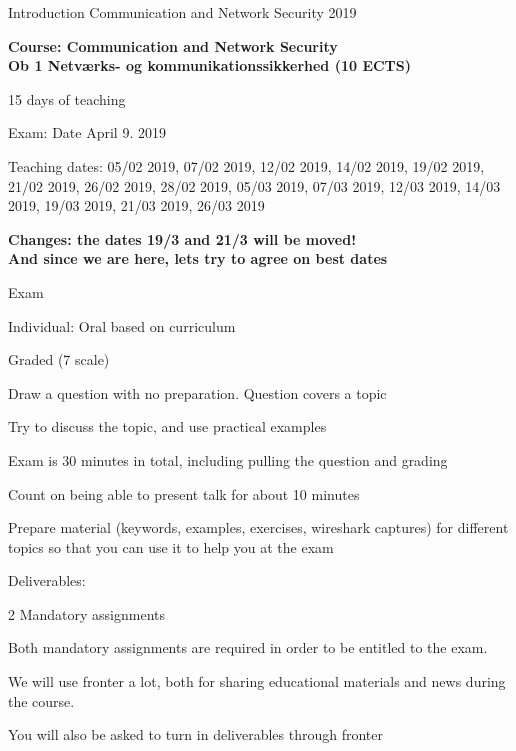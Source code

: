\documentclass[Screen16to9,17pt]{foils}
\begin{document}
\mytitlepage
{Introduction}
{Communication and Network Security 2019}

\hlkprofiluk


{\Large\bf Course: Communication and Network Security\\
Ob 1 Netværks- og kommunikationssikkerhed (10 ECTS)}

15 days of teaching

Exam:
Date April 9. 2019

Teaching dates: 05/02 2019, 07/02 2019, 12/02 2019, 14/02 2019, 19/02 2019, 21/02 2019, 26/02 2019, 28/02 2019, 05/03 2019, 07/03 2019, 12/03 2019, 14/03 2019, 19/03 2019, 21/03 2019, 26/03 2019

{\bf Changes: the dates 19/3 and 21/3 will be moved!\\
And since we are here, lets try to agree on best dates}



\begin{list2}
\item Exam
\item Individual: Oral based on curriculum
\item Graded (7 scale)
\item Draw a question with no preparation. Question covers a topic
\item Try to discuss the topic, and use practical examples
\item Exam is 30 minutes in total, including pulling the question and grading
\item Count on being able to present talk for about 10 minutes
\item Prepare material (keywords, examples, exercises, wireshark captures) for different topics so that you can use it to help you at the exam

\vskip 5mm
\item Deliverables:
\item 2 Mandatory assignments
\item Both mandatory assignments are required in order to be entitled to the exam.
\end{list2}



We will use fronter a lot, both for sharing educational materials and news during the course.

You will also be asked to turn in deliverables through fronter
\end{document}
